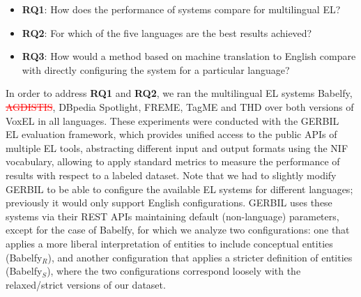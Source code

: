 \documentclass{llncs}
\begin{document}
\begin{itemize}
\item \textbf{RQ1}: How does the performance of systems compare for multilingual EL?
\item \textbf{RQ2}: For which of the five languages are the best results achieved?
\item \textbf{RQ3}: How would a method based on machine translation to English compare with directly configuring the system for a particular language?
\end{itemize}

In order to address \textbf{RQ1} and \textbf{RQ2}, we ran the multilingual EL systems Babelfy, \textcolor{red}{\st{AGDISTIS}}, DBpedia Spotlight, FREME, TagME and THD over both versions of VoxEL in all languages. These experiments were conducted with the GERBIL~\cite{gerbil-2015} EL evaluation framework, which provides unified access to the public APIs of multiple EL tools, abstracting different input and output formats using the NIF vocabulary, allowing to apply standard metrics to measure the performance of results with respect to a labeled dataset. Note that we had to slightly modify GERBIL to be able to configure the available EL systems for different languages; previously it would only support English configurations. GERBIL uses these systems via their REST APIs maintaining default (non-language) parameters, except for the case of Babelfy, for which we analyze two configurations: one that applies a more liberal interpretation of entities to include conceptual entities (Babelfy$_R$), and another configuration that applies a stricter definition of entities (Babelfy$_S$), where the two configurations correspond loosely with the relaxed/strict versions of our dataset.


\newcommand{\bl}[1]{\textbf{#1}}
\end{document}
